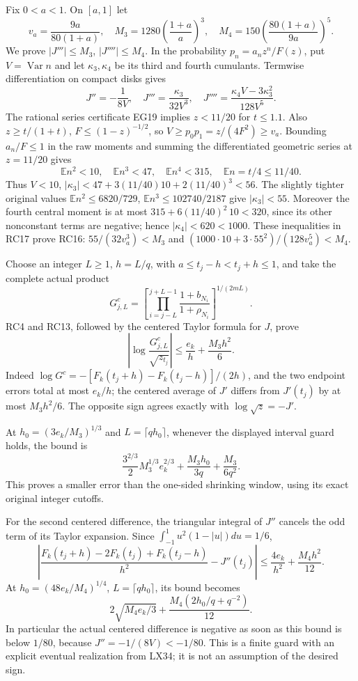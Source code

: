 \documentclass[10pt]{article}
\begin{document}
Fix \(0<a<1\). On \([a,1]\) let \[
v_a=\frac{9a}{80(1+a)},\quad
M_3=1280\left(\frac{1+a}{a}\right)^3,
\quad M_4=150\left(\frac{80(1+a)}{9a}\right)^5.
\tag{RC16}
\] We prove \(|J'''|\le M_3\), \(|J''''|\le M_4\). In the probability \(p_n=a_nz^n/F(z)\), put \(V=\operatorname{Var}n\) and let \(\kappa_3,\kappa_4\) be its third and fourth cumulants. Termwise differentiation on compact disks gives \[
J''=-\frac1{8V},\quad
J'''=\frac{\kappa_3}{32V^3},\quad
J''''=\frac{\kappa_4V-3\kappa_3^2}{128V^5}.
\tag{RC17}
\] The rational series certificate EG19 implies \(z<11/20\) for \(t\le1.1\). Also \(z\ge t/(1+t)\), \(F\le(1-z)^{-1/2}\), so \(V\ge p_0p_1=z/(4F^2)\ge v_a\). Bounding \(a_n/F\le1\) in the raw moments and summing the differentiated geometric series at \(z=11/20\) gives \[
\mathbb E n^2<10,\quad\mathbb E n^3<47,\quad
\mathbb E n^4<315,\quad\mathbb E n=t/4\le11/40.
\] Thus \(V<10\), \(|\kappa_3|<47+3(11/40)10+2(11/40)^3<56\). The slightly tighter original values \(\mathbb E n^2\le6820/729\), \(\mathbb E n^3\le102740/2187\) give \(|\kappa_3|<55\). Moreover the fourth central moment is at most \(315+6(11/40)^2\,10<320\), since its other nonconstant terms are negative; hence \(|\kappa_4|<620<1000\). These inequalities in RC17 prove RC16: \(55/(32v_a^3)<M_3\) and \((1000\cdot10+3\cdot55^2)/(128v_a^5)<M_4\).

Choose an integer \(L\ge1\), \(h=L/q\), with \(a\le t_j-h<t_j+h\le1\), and take the complete actual product \[
G^c_{j,L}=\left[\prod_{i=j-L}^{j+L-1}
\frac{1+b_{N_i}}{1+\rho_{N_i}}\right]^{1/(2mL)}.
\] RC4 and RC13, followed by the centered Taylor formula for \(J\), prove \[
\boxed{\left|\log\frac{G^c_{j,L}}{\sqrt{z_{t_j}}}\right|
\le\frac{e_k}{h}+\frac{M_3h^2}{6}.}
\tag{RC18}
\] Indeed \(\log G^c=-[F_k(t_j+h)-F_k(t_j-h)]/(2h)\), and the two endpoint errors total at most \(e_k/h\); the centered average of \(J'\) differs from \(J'(t_j)\) by at most \(M_3h^2/6\). The opposite sign agrees exactly with \(\log\sqrt z=-J'\).

At \(h_0=(3e_k/M_3)^{1/3}\) and \(L=\lceil qh_0\rceil\), whenever the displayed interval guard holds, the bound is \[
\frac{3^{2/3}}2 M_3^{1/3}e_k^{2/3}
+\frac{M_3h_0}{3q}+\frac{M_3}{6q^2}.
\tag{RC19}
\] This proves a smaller error than the one-sided shrinking window, using its exact original integer cutoffs.

For the second centered difference, the triangular integral of \(J''\) cancels the odd term of its Taylor expansion. Since \(\int_{-1}^1u^2(1-|u|)du=1/6\), \[
\boxed{\left|\frac{F_k(t_j+h)-2F_k(t_j)+F_k(t_j-h)}{h^2}
-J''(t_j)\right|\le\frac{4e_k}{h^2}+\frac{M_4h^2}{12}.}
\tag{RC20}
\] At \(h_0=(48e_k/M_4)^{1/4}\), \(L=\lceil qh_0\rceil\), its bound becomes \[
2\sqrt{M_4e_k/3}+\frac{M_4(2h_0/q+q^{-2})}{12}.
\tag{RC21}
\] In particular the actual centered difference is negative as soon as this bound is below \(1/80\), because \(J''=-1/(8V)<-1/80\). This is a finite guard with an explicit eventual realization from LX34; it is not an assumption of the desired sign.
\end{document}
